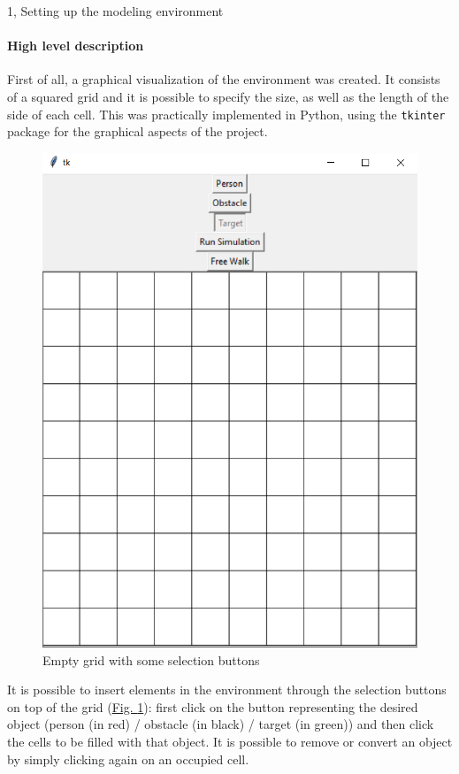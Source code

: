\documentclass[10pt,a4paper]{article}
\begin{document}
\frontpage

\begin{task}{1, Setting up the modeling environment}
\paragraph{High level description}
First of all, a graphical visualization of the environment was created.
It consists of a squared grid and it is possible to specify the size, as well as the length of the side of each cell.
This was practically implemented in Python, using the \texttt{tkinter} package for the graphical aspects of the project.

\begin{figure}[H]
    \centering
    \includegraphics[scale=0.5]{empty_grid.png}
    \caption{Empty grid with some selection buttons}
    \label{fig:empty-grid}
\end{figure}

It is possible to insert elements in the environment through the selection buttons on top of the grid (\hyperref[fig:empty-grid]{Fig. \ref{fig:empty-grid}}):
first click on the button representing the desired object (person (in red) / obstacle (in black) / target (in green)) and then click the cells to be filled with that object.
It is possible to remove or convert an object by simply clicking again on an occupied cell.


\end{task}
\end{document}
